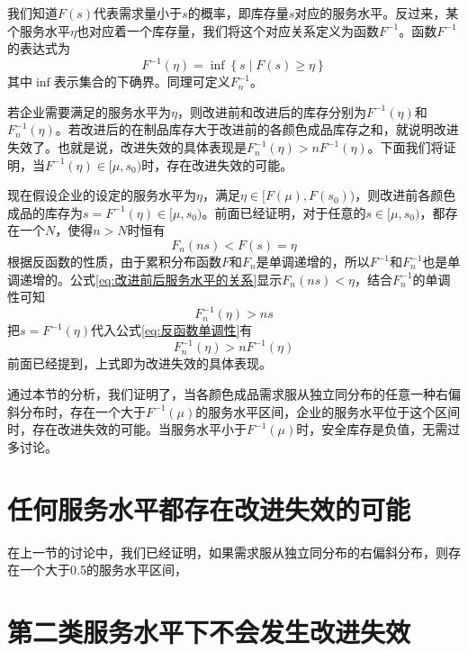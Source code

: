我们知道$F(s)$代表需求量小于$s$的概率，即库存量$s$对应的服务水平。反过来，某个服务水平$\eta$也对应着一个库存量，我们将这个对应关系定义为函数$F^{-1}$。函数$F^{-1}$的表达式为
\[
F^{-1}(\eta) = \inf\left\{s\middle|F(s)\geq\eta\right\}
\]
其中$\inf$表示集合的下确界。同理可定义$F_n^{-1}$。

若企业需要满足的服务水平为$\eta$，则改进前和改进后的库存分别为$F^{-1}(\eta)$和$F_n^{-1}(\eta)$。若改进后的在制品库存大于改进前的各颜色成品库存之和，就说明改进失效了。也就是说，改进失效的具体表现是$F_n^{-1}(\eta)>nF^{-1}(\eta)$。下面我们将证明，当$F^{-1}(\eta)\in[\mu,s_0)$时，存在改进失效的可能。

现在假设企业的设定的服务水平为$\eta$，满足$\eta\in[F(\mu),F(s_0))$，则改进前各颜色成品的库存为$s=F^{-1}(\eta)\in[\mu,s_0)$。前面已经证明，对于任意的$s\in[\mu,s_0)$，都存在一个$N$，使得$n>N$时恒有
\begin{equation}
F_n(ns)<F(s)=\eta
\label{eq:改进前后服务水平的关系}
\end{equation}
根据反函数的性质，由于累积分布函数$F$和$F_n$是单调递增的，所以$F^{-1}$和$F_n^{-1}$也是单调递增的。公式\ref{eq:改进前后服务水平的关系}显示$F_n(ns)<\eta$，结合$F_n^{-1}$的单调性可知
\begin{equation}
F_n^{-1}(\eta) > ns
\label{eq:反函数单调性}
\end{equation}
把$s=F^{-1}(\eta)$代入公式\ref{eq:反函数单调性}有
\[
F_n^{-1}(\eta)>nF^{-1}(\eta)
\]
前面已经提到，上式即为改进失效的具体表现。

通过本节的分析，我们证明了，当各颜色成品需求服从独立同分布的任意一种右偏斜分布时，存在一个大于$F^{-1}(\mu)$的服务水平区间，企业的服务水平位于这个区间时，存在改进失效的可能。当服务水平小于$F^{-1}(\mu)$时，安全库存是负值，无需过多讨论。








\section{任何服务水平都存在改进失效的可能}

在上一节的讨论中，我们已经证明，如果需求服从独立同分布的右偏斜分布，则存在一个大于0.5的服务水平区间，









\section{第二类服务水平下不会发生改进失效}




















